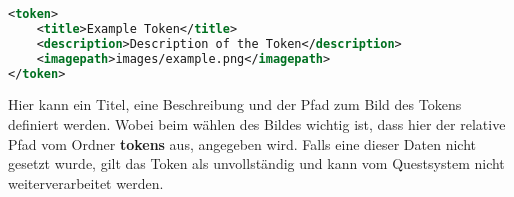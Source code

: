 \begin{lstlisting}[language=XML]
<token>
	<title>Example Token</title>
	<description>Description of the Token</description>
	<imagepath>images/example.png</imagepath>
</token>
\end{lstlisting}
Hier kann ein Titel, eine Beschreibung und der Pfad zum Bild des Tokens definiert werden. Wobei beim wählen des Bildes wichtig ist, dass hier der relative Pfad vom Ordner \textbf{tokens} aus, angegeben wird. Falls eine dieser Daten nicht gesetzt wurde, gilt das Token als unvollständig und kann vom Questsystem nicht weiterverarbeitet werden.